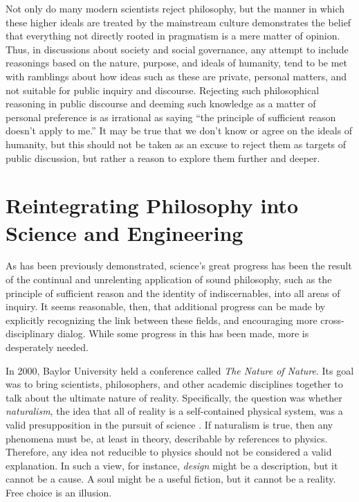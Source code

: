 Not only do many modern scientists reject philosophy, but the manner in which these higher ideals are treated by the mainstream culture demonstrates the belief that everything not directly rooted in pragmatism is a mere matter of opinion.  
Thus, in discussions about society and social governance, any attempt to include reasonings based on the nature, purpose, and ideals of humanity, tend to be met with ramblings about how ideas such as these are private, personal matters, and not suitable for public inquiry and discourse.  Rejecting such philosophical reasoning in public discourse and deeming such knowledge as a matter of personal preference is as irrational as saying ``the principle of sufficient reason doesn't apply to me.''  It may be true that we don't know or agree on the ideals of humanity, but this should not be taken as an excuse to reject them as targets of public discussion, but rather a reason to explore them further and deeper.

\section{Reintegrating Philosophy into Science and Engineering}

As has been previously demonstrated, science's great progress has been the result of the continual and unrelenting application of sound philosophy, such as the principle of sufficient reason and the identity of indiscernables, into all areas of inquiry.  It seems reasonable, then, that additional progress can be made by explicitly recognizing the link between these fields, and encouraging more cross-disciplinary dialog.  While some progress in this has been made, more is desperately needed.

In 2000, Baylor University held a conference called \textit{The Nature of Nature}.  Its goal was to bring scientists, philosophers, and other academic disciplines together to talk about the ultimate nature of reality.  Specifically, the question was whether \textit{naturalism}, the idea that all of reality is a self-contained physical system, was a valid presupposition in the pursuit of science \citep{gordondembski2011}.
If naturalism is true, then any phenomena must be, at least in theory, describable by references to physics.  Therefore, any idea not reducible to physics should not be considered a valid explanation.  In such a view, for instance, \textit{design} might be a description, but it cannot be a cause.  A soul might be a useful fiction, but it cannot be a reality.  Free choice is an illusion.  

